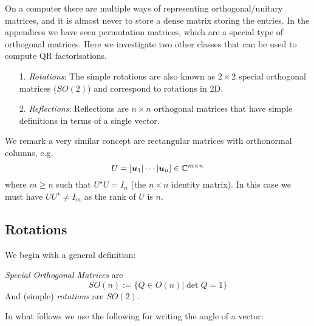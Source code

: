 On a computer there are multiple ways of representing orthogonal/unitary matrices, and it is almost never to store a dense matrix storing the entries. In the appendices we have seen permutation matrices, which are a special type of orthogonal matrices. Here we investigate two other classes that can be used to compute QR factorisations.

\begin{itemize}
\item[1. ] \emph{Rotations}: The simple rotations are also known as $2 \ensuremath{\times} 2$ special orthogonal matrices ($SO(2)$)  and correspond to rotations in 2D.


\item[2. ] \emph{Reflections}:  Reflections are $n \ensuremath{\times} n$ orthogonal matrices that have simple definitions in terms of a single vector.

\end{itemize}
We remark a very similar concept are rectangular matrices with orthonormal columns, e.g.
\[
U = [\bm{{\mbox{\boldmath$u$\unboldmath}}}_1 | \cdots | \bm{{\mbox{\boldmath$u$\unboldmath}}}_n] \in {\mathbb C}^{m \times n}
\]
where $m \ensuremath{\geq} n$ such that $U^\ensuremath{\star} U =  I_n$ (the $n \ensuremath{\times} n$ identity matrix). In this case we must have $UU^\ensuremath{\star} \ensuremath{\neq} I_m$ as the rank of $U$ is $n$. 

\subsection{Rotations}
We begin with a general definition:

\begin{definition} \emph{Special Orthogonal Matrices} are
\[
SO(n) := \{Q \ensuremath{\in} O(n) | \det Q = 1 \}
\]
And (simple) \emph{rotations} are $SO(2)$. \end{definition}

In what follows we use the following for writing the angle of a vector:

